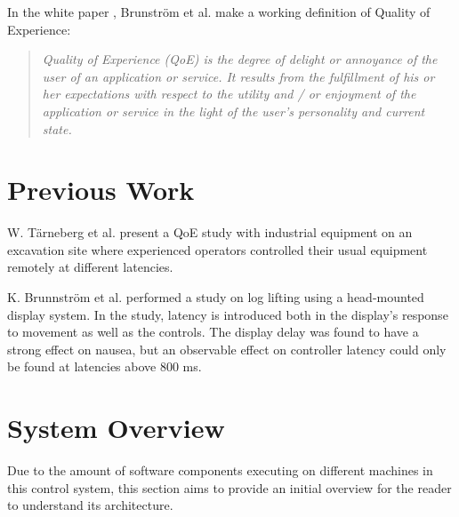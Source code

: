 \documentclass[nofilelist]{cslthse-msc}
\begin{document}
In the white paper \cite{qoe-definition}, Brunström et al. make a working definition of Quality of Experience: 

\begin{quote}
   \textit{Quality of Experience (QoE) is the degree of delight or annoyance of the user of an application or service. It results from the fulfillment of his or her expectations with respect to the utility and / or enjoyment of the application or service in the light of the user’s personality and current state.} 
\end{quote}


\section{Previous Work}

W. Tärneberg et al. \cite{industry4.0} present a QoE study with industrial equipment on an excavation site where experienced operators controlled their usual equipment remotely at different latencies. 

K. Brunnström et al. \cite{latency-impact} performed a study on log lifting using a head-mounted display system. In the study, latency is introduced both in the display's response to movement as well as the controls. The display delay was found to have a strong effect on nausea, but an observable effect on controller latency could only be found at latencies above 800 ms. 

\section{System Overview}
Due to the amount of software components executing on different machines in this control system, this section aims to provide an initial overview for the reader to understand its architecture.
\end{document}
